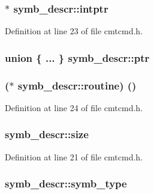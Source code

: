 \subsubsection[{\texorpdfstring{intptr}{intptr}}]{$\ast$ symb\+\_\+descr\+::intptr}\hypertarget{structsymb__descr_aaff5c0c3bb9701f2605fd1820e76cb17}{}\label{structsymb__descr_aaff5c0c3bb9701f2605fd1820e76cb17}


Definition at line 23 of file cmtcmd.\+h.

\subsubsection[{\texorpdfstring{ptr}{ptr}}]{\setlength{\rightskip}{0pt plus 5cm}union \{ ... \}   symb\+\_\+descr\+::ptr}\hypertarget{structsymb__descr_ae3740fba2c610bdb8d7ed30c6041d883}{}\label{structsymb__descr_ae3740fba2c610bdb8d7ed30c6041d883}
\subsubsection[{\texorpdfstring{routine}{routine}}]{($\ast$ symb\+\_\+descr\+::routine) ()}\hypertarget{structsymb__descr_a4c8cf5138321d2ba066a5352109ba785}{}\label{structsymb__descr_a4c8cf5138321d2ba066a5352109ba785}


Definition at line 24 of file cmtcmd.\+h.

\subsubsection[{\texorpdfstring{size}{size}}]{ symb\+\_\+descr\+::size}\hypertarget{structsymb__descr_a05dbf47e93c973eb1c57e6839270b40b}{}\label{structsymb__descr_a05dbf47e93c973eb1c57e6839270b40b}


Definition at line 21 of file cmtcmd.\+h.

\subsubsection[{\texorpdfstring{symb\+\_\+type}{symb_type}}]{ symb\+\_\+descr\+::symb\+\_\+type}\hypertarget{structsymb__descr_a80ff5ad23246fee7a7b79d95d1ef9060}{}\label{structsymb__descr_a80ff5ad23246fee7a7b79d95d1ef9060}


